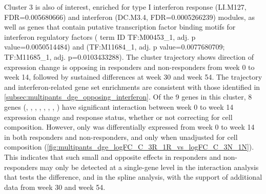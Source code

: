 \begin{outline}
Cluster 3 is also of interest, enriched for type I interferon response (LI.M127, FDR=\num{0.005680666}) and interferon (DC.M3.4, FDR=\num{0.0005266239}) modules,
as well as genes that contain putative transcription factor binding motifs for interferon regulatory factors  ( term ID TF:M00453\_1, adj. p value=\num{0.0050514484}) 
and  (TF:M11684\_1, adj. p value=\num{0.0077680709}; TF:M11685\_1, adj. p=\num{0.0103433288}).
The cluster trajectory shows direction of expression change is opposing in responders and non-responders from week 0 to week 14, followed by sustained differences at week 30 and week 54.
The trajectory and interferon-related gene set enrichments are consistent with those identified in \autoref{subsec:multipants_dge_opposing_interferon}.
Of the 9 genes in this cluster, 8 genes (, , , , , , , )
have significant interaction between week 0 to week 14 expression change and response status,
whether or not correcting for cell composition.
However, only  was differentially expressed from week 0 to week 14 in both responders and non-responders,
and only when unadjusted for cell composition (\autoref{fig:multipants_dge_logFC_C_3R_1R_vs_logFC_C_3N_1N}).
This indicates that such small and opposite effects in responders and non-responders may only be detected at a single-gene level in the interaction analysis that tests the difference,
and in the spline analysis, with the support of additional data from week 30 and week 54.



\end{outline}
